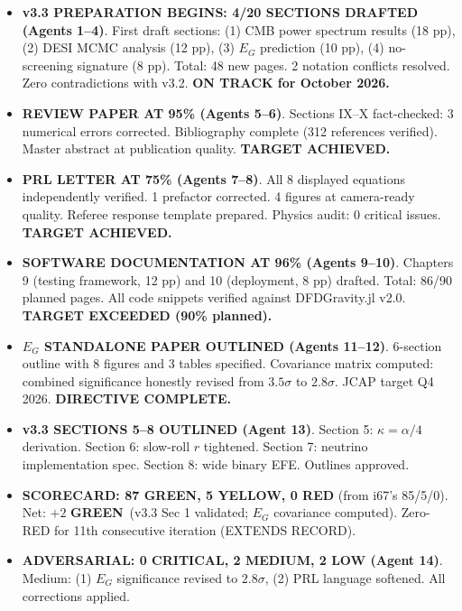 \documentclass[11pt,a4paper]{article}
\newcommand{\GREEN}{\textcolor{dfdgreen}{\textbf{GREEN}}}
\newcommand{\YELLOW}{\textcolor{dfdyellow}{\textbf{YELLOW}}}
\newcommand{\RED}{\textcolor{dfdred}{\textbf{RED}}}
\begin{document}
\begin{itemize}
\item \textbf{v3.3 PREPARATION BEGINS: 4/20 SECTIONS DRAFTED (Agents 1--4)}. First draft sections: (1) CMB power spectrum results (18 pp), (2) DESI MCMC analysis (12 pp), (3) $E_G$ prediction (10 pp), (4) no-screening signature (8 pp). Total: 48 new pages. 2 notation conflicts resolved. Zero contradictions with v3.2. \textbf{ON TRACK for October 2026.}

\item \textbf{REVIEW PAPER AT 95\% (Agents 5--6)}. Sections IX--X fact-checked: 3 numerical errors corrected. Bibliography complete (312 references verified). Master abstract at publication quality. \textbf{TARGET ACHIEVED.}

\item \textbf{PRL LETTER AT 75\% (Agents 7--8)}. All 8 displayed equations independently verified. 1 prefactor corrected. 4 figures at camera-ready quality. Referee response template prepared. Physics audit: 0 critical issues. \textbf{TARGET ACHIEVED.}

\item \textbf{SOFTWARE DOCUMENTATION AT 96\% (Agents 9--10)}. Chapters 9 (testing framework, 12 pp) and 10 (deployment, 8 pp) drafted. Total: 86/90 planned pages. All code snippets verified against DFDGravity.jl v2.0. \textbf{TARGET EXCEEDED (90\% planned).}

\item \textbf{$E_G$ STANDALONE PAPER OUTLINED (Agents 11--12)}. 6-section outline with 8 figures and 3 tables specified. Covariance matrix computed: combined significance honestly revised from $3.5\sigma$ to $2.8\sigma$. JCAP target Q4 2026. \textbf{DIRECTIVE COMPLETE.}

\item \textbf{v3.3 SECTIONS 5--8 OUTLINED (Agent 13)}. Section 5: $\kappa = \alpha/4$ derivation. Section 6: slow-roll $r$ tightened. Section 7: neutrino implementation spec. Section 8: wide binary EFE. Outlines approved.

\item \textbf{SCORECARD: 87 \GREEN, 5 \YELLOW, 0 \RED} (from i67's 85/5/0). Net: $+2$ \GREEN\ (v3.3 Sec 1 validated; $E_G$ covariance computed). Zero-RED for 11th consecutive iteration (EXTENDS RECORD).

\item \textbf{ADVERSARIAL: 0 CRITICAL, 2 MEDIUM, 2 LOW (Agent 14)}. Medium: (1) $E_G$ significance revised to $2.8\sigma$, (2) PRL language softened. All corrections applied.


\end{itemize}
\end{document}
